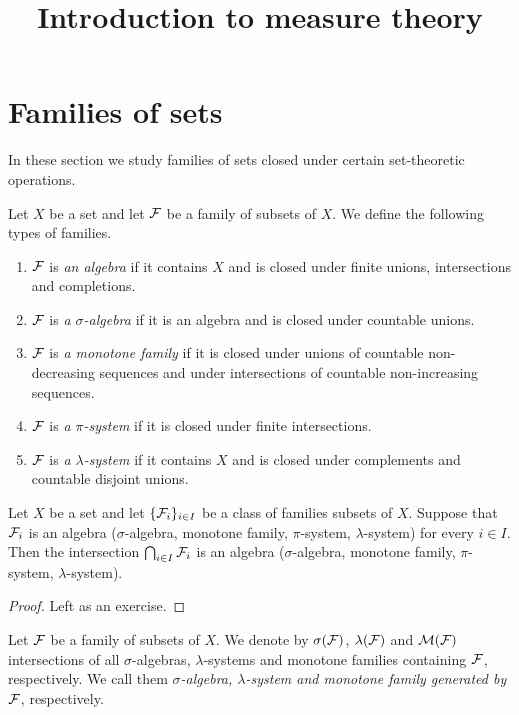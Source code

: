 



\title{Introduction to measure theory}
\date{}
\maketitle

\section{Families of sets}
\noindent
In these section we study families of sets closed under certain set-theoretic operations.

\begin{definition}
Let $X$ be a set and let ${\mathcal F}$ be a family of subsets of $X$. We define the following types of families.
\begin{enumerate}[label=\textbf{(\arabic*)}, leftmargin=*]
\item ${\mathcal F}$ is \textit{an algebra} if it contains $X$ and is closed under finite unions, intersections and completions. 
\item ${\mathcal F}$ is \textit{a $\sigma$-algebra} if it is an algebra and is closed under countable unions.
\item ${\mathcal F}$ is \textit{a monotone family} if it is closed under unions of countable non-decreasing sequences and under intersections of countable non-increasing sequences.
\item ${\mathcal F}$ is \textit{a $\pi$-system} if it is closed under finite intersections.
\item ${\mathcal F}$ is \textit{a $\lambda$-system} if it contains $X$ and is closed under complements and countable disjoint unions. 
\end{enumerate}
\end{definition}

\begin{fact}\label{fact:intersections}
Let $X$ be a set and let $\{{\mathcal F}_i\}_{i\in I}$ be a class of families subsets of $X$. Suppose that ${\mathcal F}_i$ is an algebra ($\sigma$-algebra, monotone family, $\pi$-system, $\lambda$-system) for every $i\in I$. Then the intersection $\bigcap_{i\in I}{\mathcal F}_i$
is an algebra ($\sigma$-algebra, monotone family, $\pi$-system, $\lambda$-system).
\end{fact}
\begin{proof}
Left as an exercise.
\end{proof}

\begin{definition}
Let ${\mathcal F}$ be a family of subsets of $X$. We denote by $\sigma({\mathcal F})$, $\lambda({\mathcal F})$ and ${\mathcal M}({\mathcal F})$ intersections of all $\sigma$-algebras, $\lambda$-systems and monotone families containing ${\mathcal F}$, respectively. We call them \textit{$\sigma$-algebra, $\lambda$-system and monotone family generated by ${\mathcal F}$}, respectively. 
\end{definition}

